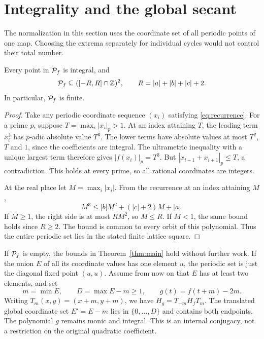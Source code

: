 \section{Integrality and the global secant}
\label{sec:secant}

The normalization in this section uses the coordinate set of all
periodic points of one map. Choosing the extrema separately for
individual cycles would not control their total number.

\begin{lemma}
\label{lem:integrality}
Every point in $\mathcal{P}_f$ is integral, and
\[
 \mathcal{P}_f\subseteq ([-R,R]\cap\mathbb{Z})^2,
 \qquad R=|a|+|b|+|c|+2.
\]
In particular, $\mathcal{P}_f$ is finite.
\end{lemma}
\begin{proof}
Take any periodic coordinate sequence $(x_i)$ satisfying
\eqref{eq:recurrence}. For a prime $p$, suppose
$T=\max_i|x_i|_p>1$. At an index attaining $T$, the leading term
$x_i^3$ has $p$-adic absolute value $T^3$. The lower terms have
absolute values at most $T^2$, $T$ and $1$, since the coefficients
are integral. The ultrametric inequality with a unique largest term
therefore gives $|f(x_i)|_p=T^3$. But
$|x_{i-1}+x_{i+1}|_p\le T$, a contradiction. This holds at every
prime, so all rational coordinates are integers.

At the real place let $M=\max_i|x_i|$. From the recurrence at an
index attaining $M$,
\[
 M^3\le |b|M^2+(|c|+2)M+|a|.
\]
If $M\ge1$, the right side is at most $RM^2$, so $M\le R$.
If $M<1$, the same bound holds since $R\ge2$. The bound is common
to every orbit of this polynomial. Thus the entire periodic set lies
in the stated finite lattice square.
\end{proof}

If $\mathcal{P}_f$ is empty, the bounds in Theorem~\ref{thm:main} hold
without further work. If the union $E$ of all its coordinate values
has one element $u$, the periodic set is just the diagonal fixed point
$(u,u)$. Assume from now on that $E$ has at least two elements, and set
\begin{equation}
 m=\min E,\qquad D=\max E-m\ge1,\qquad
 g(t)=f(t+m)-2m.
 \label{eq:normalization}
\end{equation}
Writing $T_m(x,y)=(x+m,y+m)$, we have
$H_g=T_{-m}H_fT_m$. The translated global coordinate set
$E'=E-m$ lies in $\{0,\ldots,D\}$ and contains both endpoints.
The polynomial $g$ remains monic and integral. This is an internal
conjugacy, not a restriction on the original quadratic coefficient.

